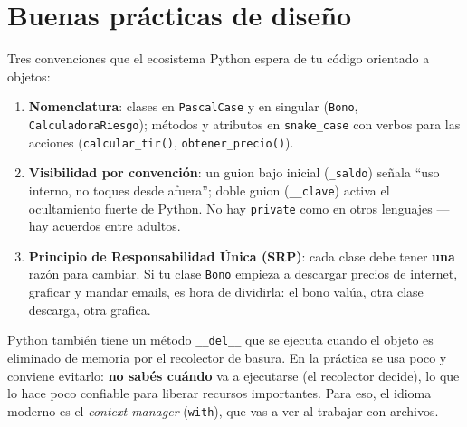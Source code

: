 \documentclass[
  spanish,
  letterpaper,
  DIV=11,
  numbers=noendperiod]{scrreprt}
\providecommand{\tightlist}{%
  \setlength{\itemsep}{0pt}\setlength{\parskip}{0pt}}
\begin{document}
\section{Buenas prácticas de
diseño}\label{buenas-pruxe1cticas-de-diseuxf1o}

Tres convenciones que el ecosistema Python espera de tu código orientado
a objetos:

\begin{enumerate}
\def\labelenumi{\arabic{enumi}.}
\tightlist
\item
  \textbf{Nomenclatura}: clases en \texttt{PascalCase} y en singular
  (\texttt{Bono}, \texttt{CalculadoraRiesgo}); métodos y atributos en
  \texttt{snake\_case} con verbos para las acciones
  (\texttt{calcular\_tir()}, \texttt{obtener\_precio()}).
\item
  \textbf{Visibilidad por convención}: un guion bajo inicial
  (\texttt{\_saldo}) señala ``uso interno, no toques desde afuera'';
  doble guion (\texttt{\_\_clave}) activa el ocultamiento fuerte de
  Python. No hay \texttt{private} como en otros lenguajes --- hay
  acuerdos entre adultos.
\item
  \textbf{Principio de Responsabilidad Única (SRP)}: cada clase debe
  tener \textbf{una} razón para cambiar. Si tu clase \texttt{Bono}
  empieza a descargar precios de internet, graficar y mandar emails, es
  hora de dividirla: el bono valúa, otra clase descarga, otra grafica.
\end{enumerate}

\begin{tcolorbox}[enhanced jigsaw, bottomrule=.15mm, colback=white, opacitybacktitle=0.6, arc=.35mm, toprule=.15mm, opacityback=0, breakable, titlerule=0mm, left=2mm, coltitle=black, colbacktitle=quarto-callout-note-color!10!white, colframe=quarto-callout-note-color-frame, leftrule=.75mm, toptitle=1mm, bottomtitle=1mm, title=\textcolor{quarto-callout-note-color}{\faInfo}\hspace{0.5em}{¿Y el destructor \texttt{\_\_del\_\_}?}, rightrule=.15mm]

Python también tiene un método \texttt{\_\_del\_\_} que se ejecuta
cuando el objeto es eliminado de memoria por el recolector de basura. En
la práctica se usa poco y conviene evitarlo: \textbf{no sabés cuándo} va
a ejecutarse (el recolector decide), lo que lo hace poco confiable para
liberar recursos importantes. Para eso, el idioma moderno es el
\emph{context manager} (\texttt{with}), que vas a ver al trabajar con
archivos.

\end{tcolorbox}
\end{document}
